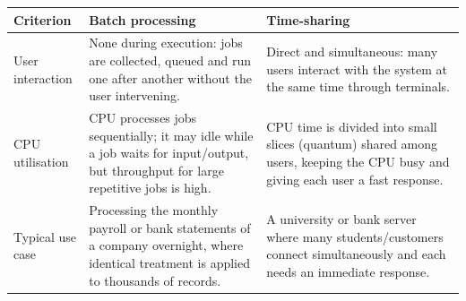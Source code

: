 \documentclass[11pt]{article}
\begin{document}
\begin{corrige}
\begin{center}
\begin{tabularx}{\linewidth}{|l|X|X|}
\hline
\rowcolor{popblueL} \textbf{Criterion} & \textbf{Batch processing} & \textbf{Time-sharing} \\
\hline
User interaction & None during execution: jobs are collected, queued and run one after another without the user intervening. & Direct and simultaneous: many users interact with the system at the same time through terminals. \\
\hline
CPU utilisation & CPU processes jobs sequentially; it may idle while a job waits for input/output, but throughput for large repetitive jobs is high. & CPU time is divided into small slices (quantum) shared among users, keeping the CPU busy and giving each user a fast response. \\
\hline
Typical use case & Processing the monthly payroll or bank statements of a company overnight, where identical treatment is applied to thousands of records. & A university or bank server where many students/customers connect simultaneously and each needs an immediate response. \\
\hline
\end{tabularx}
\end{center}
\end{corrige}
\end{document}
